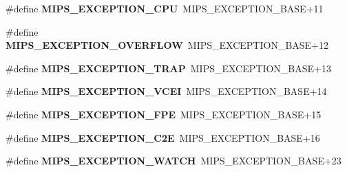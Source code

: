 \begin{DoxyCompactItemize}
\mbox{\label{group__RTEMSScoreCPUMIPSBuild_gad369ffb003a588185b60a59dfd9d1581}} 
\#define {\bfseries M\+I\+P\+S\+\_\+\+E\+X\+C\+E\+P\+T\+I\+O\+N\+\_\+\+C\+PU}~M\+I\+P\+S\+\_\+\+E\+X\+C\+E\+P\+T\+I\+O\+N\+\_\+\+B\+A\+SE+11
\item 
\mbox{\label{group__RTEMSScoreCPUMIPSBuild_ga658c2b1d68a14bd9f7abea7622398208}} 
\#define {\bfseries M\+I\+P\+S\+\_\+\+E\+X\+C\+E\+P\+T\+I\+O\+N\+\_\+\+O\+V\+E\+R\+F\+L\+OW}~M\+I\+P\+S\+\_\+\+E\+X\+C\+E\+P\+T\+I\+O\+N\+\_\+\+B\+A\+SE+12
\item 
\mbox{\label{group__RTEMSScoreCPUMIPSBuild_ga8bf8e5c7a61200fbdd1cce89877f46f1}} 
\#define {\bfseries M\+I\+P\+S\+\_\+\+E\+X\+C\+E\+P\+T\+I\+O\+N\+\_\+\+T\+R\+AP}~M\+I\+P\+S\+\_\+\+E\+X\+C\+E\+P\+T\+I\+O\+N\+\_\+\+B\+A\+SE+13
\item 
\mbox{\label{group__RTEMSScoreCPUMIPSBuild_gae5e0ec563fea6fe1b7bad19f28ef9c2d}} 
\#define {\bfseries M\+I\+P\+S\+\_\+\+E\+X\+C\+E\+P\+T\+I\+O\+N\+\_\+\+V\+C\+EI}~M\+I\+P\+S\+\_\+\+E\+X\+C\+E\+P\+T\+I\+O\+N\+\_\+\+B\+A\+SE+14
\item 
\mbox{\label{group__RTEMSScoreCPUMIPSBuild_ga9116907d2b536d3b2654f9df1a7b4198}} 
\#define {\bfseries M\+I\+P\+S\+\_\+\+E\+X\+C\+E\+P\+T\+I\+O\+N\+\_\+\+F\+PE}~M\+I\+P\+S\+\_\+\+E\+X\+C\+E\+P\+T\+I\+O\+N\+\_\+\+B\+A\+SE+15
\item 
\mbox{\label{group__RTEMSScoreCPUMIPSBuild_ga5633fefc67601704c7dee6332c580c67}} 
\#define {\bfseries M\+I\+P\+S\+\_\+\+E\+X\+C\+E\+P\+T\+I\+O\+N\+\_\+\+C2E}~M\+I\+P\+S\+\_\+\+E\+X\+C\+E\+P\+T\+I\+O\+N\+\_\+\+B\+A\+SE+16
\item 
\mbox{\label{group__RTEMSScoreCPUMIPSBuild_ga4b68445bd24d8a1a9ded80e7a8d39a3a}} 
\#define {\bfseries M\+I\+P\+S\+\_\+\+E\+X\+C\+E\+P\+T\+I\+O\+N\+\_\+\+W\+A\+T\+CH}~M\+I\+P\+S\+\_\+\+E\+X\+C\+E\+P\+T\+I\+O\+N\+\_\+\+B\+A\+SE+23
\item 
\mbox{\label{group__RTEMSScoreCPUMIPSBuild_ga2fb34d5b9a512c98bbc4e39dbd2ed2eb}} 

\end{DoxyCompactItemize}
